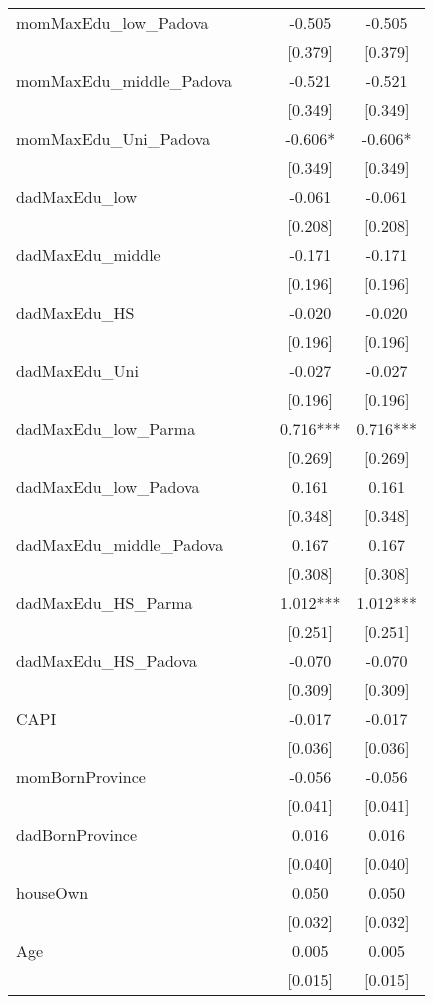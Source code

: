 \documentclass[]{article}
\begin{document}
\begin{tabular}{lcccc}
momMaxEdu\_low\_Padova &  &  & -0.505 & -0.505 \\
 &  &  & [0.379] & [0.379] \\
momMaxEdu\_middle\_Padova &  &  & -0.521 & -0.521 \\
 &  &  & [0.349] & [0.349] \\
momMaxEdu\_Uni\_Padova &  &  & -0.606* & -0.606* \\
 &  &  & [0.349] & [0.349] \\
dadMaxEdu\_low &  &  & -0.061 & -0.061 \\
 &  &  & [0.208] & [0.208] \\
dadMaxEdu\_middle &  &  & -0.171 & -0.171 \\
 &  &  & [0.196] & [0.196] \\
dadMaxEdu\_HS &  &  & -0.020 & -0.020 \\
 &  &  & [0.196] & [0.196] \\
dadMaxEdu\_Uni &  &  & -0.027 & -0.027 \\
 &  &  & [0.196] & [0.196] \\
dadMaxEdu\_low\_Parma &  &  & 0.716*** & 0.716*** \\
 &  &  & [0.269] & [0.269] \\
dadMaxEdu\_low\_Padova &  &  & 0.161 & 0.161 \\
 &  &  & [0.348] & [0.348] \\
dadMaxEdu\_middle\_Padova &  &  & 0.167 & 0.167 \\
 &  &  & [0.308] & [0.308] \\
dadMaxEdu\_HS\_Parma &  &  & 1.012*** & 1.012*** \\
 &  &  & [0.251] & [0.251] \\
dadMaxEdu\_HS\_Padova &  &  & -0.070 & -0.070 \\
 &  &  & [0.309] & [0.309] \\
CAPI &  &  & -0.017 & -0.017 \\
 &  &  & [0.036] & [0.036] \\
momBornProvince &  &  & -0.056 & -0.056 \\
 &  &  & [0.041] & [0.041] \\
dadBornProvince &  &  & 0.016 & 0.016 \\
 &  &  & [0.040] & [0.040] \\
houseOwn &  &  & 0.050 & 0.050 \\
 &  &  & [0.032] & [0.032] \\
Age &  &  & 0.005 & 0.005 \\
 &  &  & [0.015] & [0.015] \\

\end{tabular}
\end{document}

